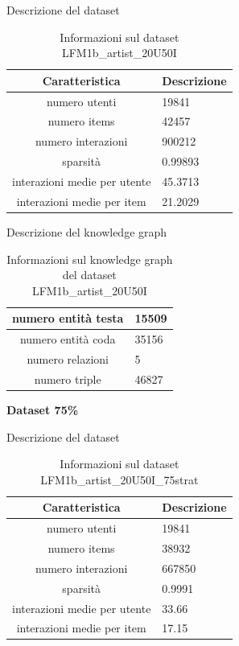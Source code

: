 \noindent Descrizione del dataset
\begin{table}[H]
    \centering
    \footnotesize
    \begin{tabularx}{\textwidth}{|c|X|}
        \hline
        \textbf{Caratteristica} & \textbf{Descrizione} \\
        \hline
        numero utenti & 19841 \\
        \hline
        numero items & 42457 \\
        \hline
        numero interazioni & 900212 \\
        \hline
        sparsità & 0.99893 \\
        \hline
        interazioni medie per utente & 45.3713 \\
        \hline
        interazioni medie per item & 21.2029 \\
        \hline
    \end{tabularx}
    \caption{Informazioni sul dataset LFM1b\_artist\_20U50I}
    \label{tab:dataset_info}
\end{table}


\noindent Descrizione del knowledge graph
\begin{table}[H]
    \centering
    \footnotesize
    \begin{tabularx}{\textwidth}{|c|X|}
        \hline
        numero entità testa & 15509 \\
        \hline
        numero entità coda & 35156 \\
        \hline
        numero relazioni & 5 \\
        \hline
        numero triple & 46827 \\
        \hline
    \end{tabularx}
    \caption{Informazioni sul knowledge graph del dataset LFM1b\_artist\_20U50I}
    \label{tab:dataset_info}
\end{table}

\noindent\textbf{Dataset 75\%}

\noindent Descrizione del dataset
\begin{table}[H]
    \centering
    \footnotesize
    \begin{tabularx}{\textwidth}{|c|X|}
        \hline
        \textbf{Caratteristica} & \textbf{Descrizione} \\
        \hline
        numero utenti & 19841 \\
        \hline
        numero items & 38932 \\
        \hline
        numero interazioni & 667850 \\
        \hline
        sparsità & 0.9991 \\
        \hline
        interazioni medie per utente & 33.66\\
        \hline
        interazioni medie per item & 17.15 \\
        \hline
    \end{tabularx}
    \caption{Informazioni sul dataset LFM1b\_artist\_20U50I\_75strat}
    \label{tab:dataset_info}
\end{table}


